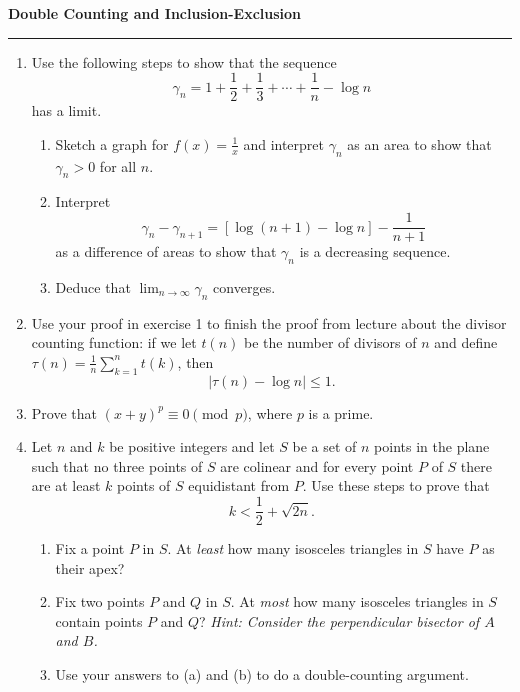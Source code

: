 \documentclass[12pt]{article}
\begin{document}
\begin{center}
{\bf \Large Double Counting and Inclusion-Exclusion}
\vspace{0.2cm}
\hrule
\end{center}

\begin{enumerate}
	\item Use the following steps to show that the sequence
	\[
	\gamma_n = 1 + \frac{1}{2} + \frac{1}{3} + \cdots + \frac{1}{n} - \log n
	\]
	has a limit.
	\begin{enumerate}
		\item Sketch a graph for $f(x) = \frac{1}{x}$ and interpret $\gamma_n$ as an area to show that $\gamma_n > 0$ for all $n$.
		\vfill
		\item Interpret
		\[
		\gamma_n - \gamma_{n+1} = [\log(n+1) - \log n] - \frac{1}{n+1}
		\]
		as a difference of areas to show that $\gamma_n$ is a decreasing sequence.
		\vfill
		\item Deduce that $\lim_{n\to \infty}\gamma_n$ converges.
	\end{enumerate}
	\vfill
	\item Use your proof in exercise 1 to finish the proof from lecture about the divisor counting function: if we let $t(n)$ be the number of divisors of $n$ and define $\tau(n) = \frac{1}{n}\sum_{k=1}^nt(k)$, then
	\[
	|\tau(n)-\log n| \leq 1.
	\]
	\vfill

	\item Prove that $(x+y)^p \equiv 0 \pmod{p}$, where $p$ is a prime.
	\vfill

	\item Let $n$ and $k$ be positive integers and let $S$ be a set of $n$ points in the plane such that no three points of $S$ are colinear and for every point $P$ of $S$ there are at least $k$ points of $S$ equidistant from $P$. Use these steps to prove that
	\[
	k < \frac{1}{2} + \sqrt{2n}.
	\]
	\begin{enumerate}
		\item Fix a point $P$ in $S$. At \textit{least} how many isosceles triangles in $S$ have $P$ as their apex?
		\item Fix two points $P$ and $Q$ in $S$. At \textit{most} how many isosceles triangles in $S$ contain points $P$ and $Q$? \textit{Hint: Consider the perpendicular bisector of $A$ and $B$.}
		\item Use your answers to (a) and (b) to do a double-counting argument.
	\end{enumerate}
	\vfill\null\pagebreak


\end{enumerate}
\end{document}
